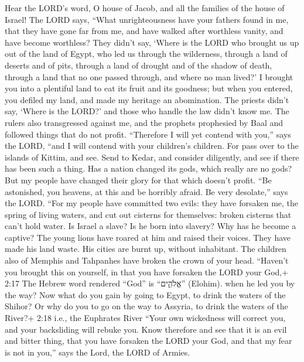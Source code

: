 Hear the LORD's word, O house of Jacob, and all the
families of the house of Israel!  The LORD says, ``What
unrighteousness have your fathers found in me, that they have gone far
from me, and have walked after worthless vanity, and have become
worthless?  They didn't say, `Where is the LORD who brought
us up out of the land of Egypt, who led us through the wilderness,
through a land of deserts and of pits, through a land of drought and of
the shadow of death, through a land that no one passed through, and
where no man lived?'  I brought you into a plentiful land to
eat its fruit and its goodness; but when you entered, you defiled my
land, and made my heritage an abomination.  The priests
didn't say, `Where is the LORD?' and those who handle the law didn't
know me. The rulers also transgressed against me, and the prophets
prophesied by Baal and followed things that do not profit. 
``Therefore I will yet contend with you,'' says the LORD, ``and I will
contend with your children's children.  For pass over to
the islands of Kittim, and see. Send to Kedar, and consider diligently,
and see if there has been such a thing.  Has a nation
changed its gods, which really are no gods? But my people have changed
their glory for that which doesn't profit.  ``Be
astonished, you heavens, at this and be horribly afraid. Be very
desolate,'' says the LORD.  ``For my people have committed
two evils: they have forsaken me, the spring of living waters, and cut
out cisterns for themselves: broken cisterns that can't hold water.
 Is Israel a slave? Is he born into slavery? Why has he
become a captive?  The young lions have roared at him and
raised their voices. They have made his land waste. His cities are burnt
up, without inhabitant.  The children also of Memphis and
Tahpanhes have broken the crown of your head.  ``Haven't
you brought this on yourself, in that you have forsaken the LORD your
God,+ 2:17 The Hebrew word rendered ``God'' is ``אֱלֹהִ֑ים'' (Elohim).
when he led you by the way?  Now what do you gain by going
to Egypt, to drink the waters of the Shihor? Or why do you to go on the
way to Assyria, to drink the waters of the River?+ 2:18 i.e., the
Euphrates River  ``Your own wickedness will correct you,
and your backsliding will rebuke you. Know therefore and see that it is
an evil and bitter thing, that you have forsaken the LORD your God, and
that my fear is not in you,'' says the Lord, the LORD of Armies.
